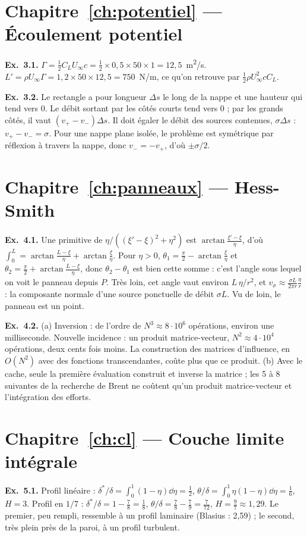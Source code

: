 \section*{Chapitre~\ref{ch:potentiel} — Écoulement potentiel}
\textbf{Ex.~3.1.} $\Gamma=\tfrac12C_LU_\infty c=\tfrac12\times0{,}5\times50\times1=12{,}5$~m\textsuperscript{2}/s. $L'=\rho U_\infty\Gamma=1{,}2\times50\times12{,}5=750$~N/m, ce qu'on retrouve par $\tfrac12\rho U_\infty^2cC_L$.

\textbf{Ex.~3.2.} Le rectangle a pour longueur $\Delta s$ le long de la nappe et une hauteur qui tend vers 0. Le débit sortant par les côtés courts tend vers 0 ; par les grands côtés, il vaut $(v_+-v_-)\Delta s$. Il doit égaler le débit des sources contenues, $\sigma\Delta s$ : $v_+-v_-=\sigma$. Pour une nappe plane isolée, le problème est symétrique par réflexion à travers la nappe, donc $v_-=-v_+$, d'où $\pm\sigma/2$.

\section*{Chapitre~\ref{ch:panneaux} — Hess-Smith}
\textbf{Ex.~4.1.} Une primitive de $\eta/((\xi'-\xi)^2+\eta^2)$ est $\arctan\frac{\xi'-\xi}{\eta}$, d'où $\int_0^L=\arctan\frac{L-\xi}{\eta}+\arctan\frac{\xi}{\eta}$. Pour $\eta>0$, $\theta_1=\tfrac\pi2-\arctan\frac\xi\eta$ et $\theta_2=\tfrac\pi2+\arctan\frac{L-\xi}{\eta}$, donc $\theta_2-\theta_1$ est bien cette somme : c'est l'angle sous lequel on voit le panneau depuis $P$. Très loin, cet angle vaut environ $L\,\eta/r^2$, et $v_\sigma\approx\frac{\sigma L}{2\pi r}\frac{\eta}{r}$ : la composante normale d'une source ponctuelle de débit $\sigma L$. Vu de loin, le panneau est un point.

\textbf{Ex.~4.2.} (a) Inversion : de l'ordre de $N^3\approx8\cdot10^6$ opérations, environ une milliseconde. Nouvelle incidence : un produit matrice-vecteur, $N^2\approx4\cdot10^4$ opérations, deux cents fois moins. La construction des matrices d'influence, en $O(N^2)$ avec des fonctions transcendantes, coûte plus que ce produit. (b) Avec le cache, seule la première évaluation construit et inverse la matrice ; les 5 à 8 suivantes de la recherche de Brent ne coûtent qu'un produit matrice-vecteur et l'intégration des efforts.

\section*{Chapitre~\ref{ch:cl} — Couche limite intégrale}
\textbf{Ex.~5.1.} Profil linéaire : $\delta^*/\delta=\int_0^1(1-\eta)\dd\eta=\tfrac12$, $\theta/\delta=\int_0^1\eta(1-\eta)\dd\eta=\tfrac16$, $H=3$. Profil en $1/7$ : $\delta^*/\delta=1-\tfrac78=\tfrac18$, $\theta/\delta=\tfrac78-\tfrac79=\tfrac7{72}$, $H=\tfrac97\approx1{,}29$. Le premier, peu rempli, ressemble à un profil laminaire (Blasius : 2,59) ; le second, très plein près de la paroi, à un profil turbulent.

